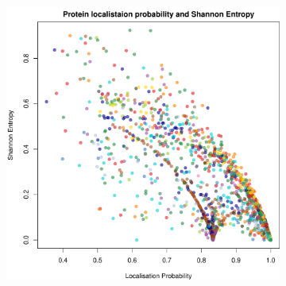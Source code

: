 \documentclass[12pt,english]{article}\usepackage[]{graphicx}\usepackage[]{color}
\makeatletter
\def\maxwidth{ %
  \ifdim\Gin@nat@width>\linewidth
    \linewidth
  \else
    \Gin@nat@width
  \fi
}
\newenvironment{knitrout}{}{} %
\makeatother
\begin{document}
\begin{figure}[h]
  \centering
  \begin{subfigure}[t]{0.5\textwidth}
    \centering
\begin{knitrout}
\color{fgcolor}

{\centering \includegraphics[width=\maxwidth]{figure/unnamed-chunk-26-1} 

}



\end{knitrout}
    \caption{}
  \end{subfigure}%
~
  \begin{subfigure}[t]{0.5\textwidth}
    \centering
\begin{knitrout}
\color{fgcolor}


\end{knitrout}
\end{subfigure}
\end{figure}
\end{document}
